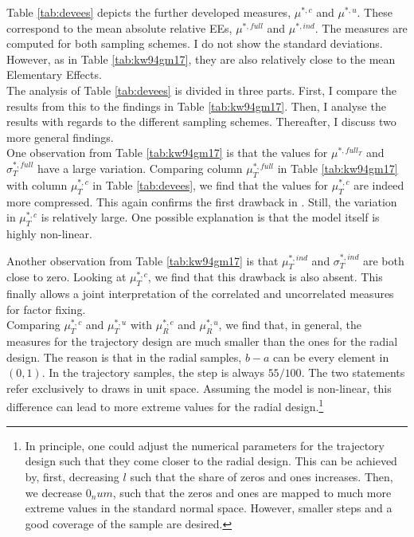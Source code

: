 \documentclass[a4paper,12pt]{article}
\begin{document}
\noindent
Table \ref{tab:devees} depicts the further developed measures, $\mu^{*,c}$ and $\mu^{*,u}$. These correspond to the mean absolute relative EEs, $\mu^{*,full}$ and $\mu^{*,ind}$. The measures are computed for both sampling schemes. I do not show the standard deviations. However, as in Table \ref{tab:kw94gm17}, they are also relatively close to the mean Elementary Effects.\\

\noindent
The analysis of Table \ref{tab:devees} is divided in three parts. First, I compare the results from this to the findings in Table \ref{tab:kw94gm17}. Then, I analyse the results with regards to the different sampling schemes. Thereafter, I discuss two more general findings.\\

\noindent
One observation from Table \ref{tab:kw94gm17} is that the values for $\mu^{*,full_T}$ and $\sigma^{*,full}_T$ have a large variation. Comparing column $\mu^{*,full}_T$ in Table \ref{tab:kw94gm17} with column $\mu^{*,c}_T$ in Table \ref{tab:devees}, we find that the values for $\mu^{*,c}_T$ are indeed more compressed. This again confirms the first drawback in \cite{ge2017extending}. Still, the variation in $\mu^{*,c}_T$ is relatively large. One possible explanation is that the model itself is highly non-linear.

Another observation from Table \ref{tab:kw94gm17} is that $\mu^{*,ind}_T$ and $\sigma^{*,ind}_T$ are both close to zero. Looking at $\mu^{*,c}_T$, we find that this drawback is also absent. This finally allows a joint interpretation of the correlated and uncorrelated measures for factor fixing.\\

\noindent
Comparing $\mu^{*,c}_T$ and $\mu^{*,u}_T$ with $\mu^{*,c}_R$ and $\mu^{*,u}_R$, we find that, in general, the measures for the trajectory design are much smaller than the ones for the radial design. The reason is that in the radial samples, $b-a$ can be every element in $(0,1)$. In the trajectory samples, the step is always $55/100$. The two statements refer exclusively to draws in unit space. Assuming the model is non-linear, this difference can lead to more extreme values for the radial design.\footnote{In principle, one could adjust the numerical parameters for the trajectory design such that they come closer to the radial design. This can be achieved by, first, decreasing $l$ such that the share of zeros and ones increases. Then, we decrease $0_num$, such that the zeros and ones are mapped to much more extreme values in the standard normal space. However, smaller steps and a good coverage of the sample are desired.}\\
\end{document}
